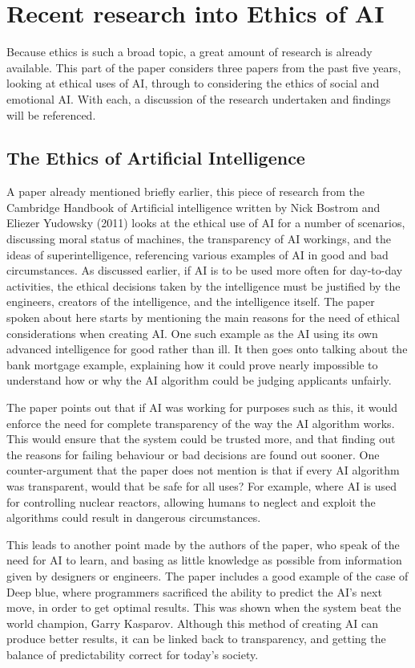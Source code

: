 \documentclass[article]{IEEEtran}
\begin{document}
\section{Recent research into Ethics of AI}
Because ethics is such a broad topic, a great amount of research is already available. This part of the paper considers three papers from the past five years, looking at ethical uses of AI, through to considering the ethics of social and emotional AI. With each, a discussion of the research undertaken and findings will be referenced.

\subsection{The Ethics of Artificial Intelligence}
A paper already mentioned briefly earlier, this piece of research from the Cambridge Handbook of Artificial intelligence \cite{ethics important} written by Nick Bostrom and Eliezer Yudowsky (2011) looks at the ethical use of AI for a number of scenarios, discussing moral status of machines, the transparency of AI workings, and the ideas of superintelligence, referencing various examples of AI in good and bad circumstances. 
As discussed earlier, if AI is to be used more often for day-to-day activities, the ethical decisions taken by the intelligence must be justified by the engineers, creators of the intelligence, and the intelligence itself. The paper spoken about here starts by mentioning the main reasons for the need of ethical considerations when creating AI. One such example as the AI using its own advanced intelligence for good rather than ill. It then goes onto talking about the bank mortgage example, explaining how it could prove nearly impossible to understand how or why the AI algorithm could be judging applicants unfairly. \par
The paper points out that if AI was working for purposes such as this, it would enforce the need for complete transparency of the way the AI algorithm works. This would ensure that the system could be trusted more, and that finding out the reasons for failing behaviour or bad decisions are found out sooner. One counter-argument that the paper does not mention is that if every AI algorithm was transparent, would that be safe for all uses? For example, where AI is used for controlling nuclear reactors, allowing humans to neglect and exploit the algorithms could result in dangerous circumstances. \par
This leads to another point made by the authors of the paper, who speak of the need for AI to learn, and basing as little knowledge as possible from information given by designers or engineers. The paper includes a good example of the case of Deep blue, where programmers sacrificed the ability to predict the AI's next move, in order to get optimal results. This was shown when the system beat the world champion, Garry Kasparov. Although this method of creating AI can produce better results, it can be linked back to transparency, and getting the balance of predictability correct for today's society.\par
\end{document}
